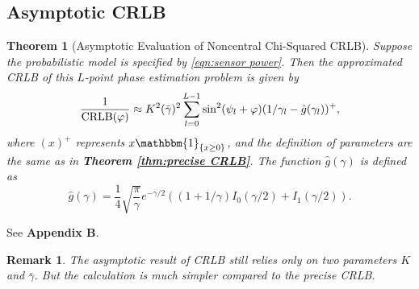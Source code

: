 \documentclass[12pt,draftclsnofoot,journal,onecolumn]{IEEEtran}
\newtheorem{theorem}{\bf Theorem}
\newtheorem{remark}{\bf Remark}
\theoremstyle{nonumberplain}
\begin{document}
\subsection{Asymptotic CRLB}
    \begin{theorem}[Asymptotic Evaluation of Noncentral Chi-Squared CRLB] \label{thm:asymptotic CRLB}
        Suppose the probabilistic model is specified by \eqref{eqn:sensor power}. Then the approximated CRLB of this $L$-point phase estimation problem is given by 
        \begin{equation}
            \frac{1}{{\rm CRLB}(\varphi)}\approx K^2(\bar{\gamma})^2 \sum_{l=0}^{L-1}\sin^2(\psi_l+\varphi)(1/\gamma_l-\hat{g}(\gamma_l))^{+},
            \label{eqn:asymptotic CRLB}
        \end{equation}
        where $(x)^{+}$ represents ${x{\mathbbm{1}}_{\{x\geq 0\}}}$, and the definition of parameters are the same as in {\bf Theorem \ref{thm:precise CRLB}}. The function $\hat{g}(\gamma)$ is defined as 
        \begin{equation}
            \hat{g}(\gamma) = \frac{1}{4} \sqrt{\frac{\pi}{\gamma}}e^{-\gamma/2}\left((1+1/\gamma)I_0(\gamma/2) + I_1(\gamma/2)\right).
            \label{eqn:definition g function}
        \end{equation}
    \end{theorem}
    \begin{IEEEproof}
        See {\bf Appendix B}. 
    \end{IEEEproof}
    \begin{remark}
        The asymptotic result of CRLB still relies only on two parameters $K$ and $\bar{\gamma}$. But the calculation is much simpler compared to the precise CRLB. 
    \end{remark}
\end{document}
